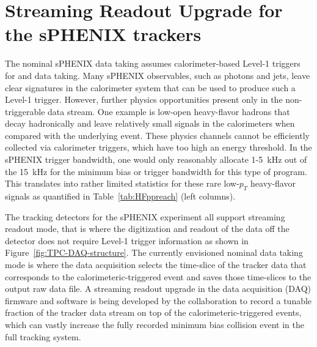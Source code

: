 
\section{Streaming Readout Upgrade for the sPHENIX trackers}

The nominal sPHENIX data taking assumes calorimeter-based Level-1 triggers for \pp and \pau data taking.  Many sPHENIX observables, such as photons and jets, leave clear signatures in the calorimeter system that can be used to produce such a Level-1 trigger. However, further physics opportunities present only in the non-triggerable data stream. One example is low-\pt open heavy-flavor hadrons that decay hadronically and leave relatively small signals in the
calorimeters when compared with the underlying event. 
These physics channels cannot be efficiently collected via calorimeter triggers, which have too high an energy threshold.
In the sPHENIX trigger
bandwidth, one would only reasonably allocate 1-5~kHz out of the 15~kHz for the
minimum bias \pp or \pau trigger bandwidth for this type of program. 
This translates into rather limited statistics for these rare low-$p_T$ heavy-flavor
signals as quantified in Table~\ref{tab:HFppreach}  (left columns).

The tracking detectors for the sPHENIX experiment all support streaming readout mode, that is where the digitization and readout of the data off the detector does not require Level-1 trigger information as shown in Figure~\ref{fig:TPC-DAQ-structure}. The currently envisioned nominal data taking mode is where the data acquisition selects the time-slice of the tracker data that  corresponds to the calorimeteric-triggered event and saves those time-slices to the output raw data file. 
A streaming readout upgrade in the data acquisition (DAQ) firmware and software is being developed by the collaboration to record a tunable fraction of the tracker data stream on top of the calorimeteric-triggered events, which can vastly increase the fully recorded minimum bias collision event in the full tracking system. 

